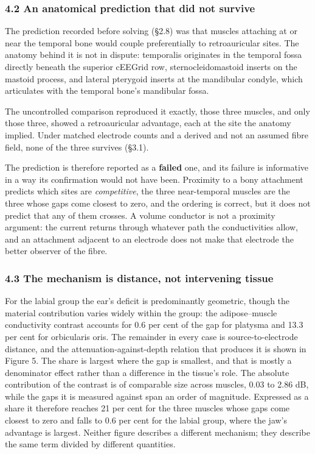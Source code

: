 \documentclass[
  11pt,
  a4paper,
]{article}
\newcounter{none} %
\begin{document}
\subsubsection{4.2 An anatomical prediction that did not survive}\label{an-anatomical-prediction-that-did-not-survive}

The prediction recorded before solving (\S{}2.8) was that muscles attaching at or
near the temporal bone would couple preferentially to retroauricular sites.
The anatomy behind it is not in dispute: temporalis originates in the temporal
fossa directly beneath the superior cEEGrid row, sternocleidomastoid inserts on
the mastoid process, and lateral pterygoid inserts at the mandibular condyle,
which articulates with the temporal bone's mandibular fossa.

The uncontrolled comparison reproduced it exactly, those three muscles, and only
those three, showed a retroauricular advantage, each at the site the anatomy
implied. Under matched electrode counts and a derived and not an assumed fibre
field, none of the three survives (\S{}3.1).

The prediction is therefore reported as a \textbf{failed} one, and its failure is
informative in a way its confirmation would not have been. Proximity to a bony
attachment predicts which sites are \emph{competitive}, the three near-temporal
muscles are the three whose gaps come closest to zero, and the ordering is
correct, but it does not predict that any of them crosses. A volume conductor is
not a proximity argument: the current returns through whatever path the
conductivities allow, and an attachment adjacent to an electrode does not make
that electrode the better observer of the fibre.

\subsubsection{4.3 The mechanism is distance, not intervening tissue}\label{the-mechanism-is-distance-not-intervening-tissue}

For the labial group the ear's deficit is predominantly geometric, though the
material contribution varies widely within the group: the adipose--muscle
conductivity contrast accounts for 0.6 per cent of the gap for platysma and
13.3 per cent for orbicularis oris. The remainder in every case is
source-to-electrode distance, and the attenuation-against-depth relation that
produces it is shown in Figure 5. The share is largest where the gap is
smallest, and that is mostly a denominator effect rather than a difference in
the tissue's role. The absolute contribution of the contrast is of comparable
size across muscles, 0.03 to 2.86 dB, while the gaps it is measured against
span an order of magnitude. Expressed as a share it therefore reaches 21 per
cent for the three muscles whose gaps come closest to zero and falls to 0.6
per cent for the labial group, where the jaw's advantage is largest. Neither
figure describes a different mechanism; they describe the same term divided by
different quantities.
\end{document}
